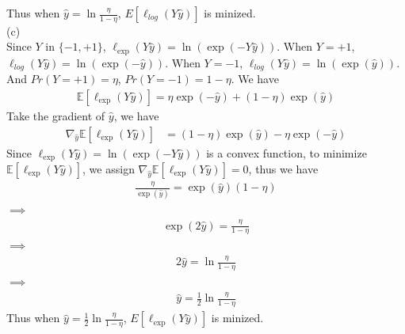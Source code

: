 \documentclass[twoside,11pt]{homework}
\begin{document}
Thus when $\hat y = \ln \frac{\eta}{1 - \eta}$, ${E}[\ell_{log} (Y \hat y)]$ is minized. \\


(c) \\
Since $Y$ in $\{-1, +1\}$, $\ell_{\exp}(Y \hat y) = \ln (\exp (-Y\hat y))$.
When $Y = +1$, $\ell_{log}(Y\hat y) = \ln (\exp (- \hat y))$.
When $Y = -1$, $\ell_{log}(Y \hat y) = \ln (\exp ( \hat y))$.
And $Pr(Y = +1) = \eta$, $Pr(Y= -1) = 1 - \eta $. We have 
\begin{align*}
\mathbb{E}[\ell_{\exp} (Y \hat y)] = \eta \exp (-\hat y) + (1-\eta) \exp (\hat y)
\end{align*}
Take the gradient of $\hat y$, we have 
\begin{align*}
\nabla _ {\hat y} \mathbb{E}[\ell_{\exp} (Y \hat y)]  &=  (1- \eta) \exp (\hat y)- \eta \exp (- \hat y) 
\end{align*}
Since $\ell_{\exp}(Y \hat y) = \ln (\exp (-Y\hat y))$ is a convex function, to minimize $\mathbb{E}[\ell_{\exp} (Y \hat y)]$, we assign $\nabla _ {\hat y} \mathbb{E}[\ell_{\exp} (Y \hat y)] = 0$, thus we have
\begin{align*}
\frac {\eta}{\exp(\hat y)} = \exp (\hat y) (1 - \eta )
\end{align*}
$\implies$
\begin{align*}
\exp (2\hat y) = \frac {\eta}{1-\eta}
\end{align*}
$\implies$
\begin{align*}
2\hat y = \ln \frac {\eta}{1-\eta}
\end{align*}
$\implies$
\begin{align*}
\hat y = \frac {1}{2} \ln \frac {\eta}{1-\eta}
\end{align*}
 Thus when $\hat y = \frac {1}{2} \ln \frac {\eta}{1-\eta}$, ${E}[\ell_{\exp} (Y \hat y)]$ is minized. \\
\end{document}
